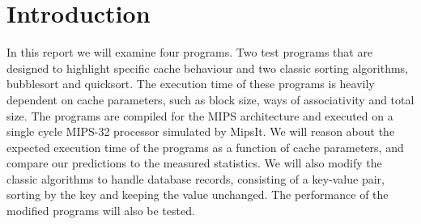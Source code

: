 \section{Introduction}
In this report we will examine four programs. Two test programs that are designed to highlight specific cache behaviour and two
classic sorting algorithms, bubblesort and quicksort. The execution time of these programs is heavily dependent on cache parameters, 
such as block size, ways of associativity and total size. The programs are compiled for the MIPS architecture and executed on a 
single cycle MIPS-32 processor simulated by MipsIt. We will reason about the expected execution time of the programs as a function of
cache parameters, and compare our predictions to the measured statistics. We will also modify the classic algorithms to handle database
records, consisting of a key-value pair, sorting by the key and keeping the value unchanged. The performance of the modified programs 
will also be tested.
